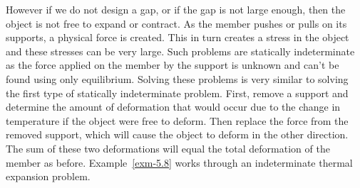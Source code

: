\documentclass[
  letterpaper,
  DIV=11,
  numbers=noendperiod]{scrreprt}
\theoremstyle{definition}
\theoremstyle{remark}
\begin{document}
However if we do not design a gap, or if the gap is not large enough,
then the object is not free to expand or contract. As the member pushes
or pulls on its supports, a physical force is created. This in turn
creates a stress in the object and these stresses can be very large.
Such problems are statically indeterminate as the force applied on the
member by the support is unknown and can't be found using only
equilibrium. Solving these problems is very similar to solving the first
type of statically indeterminate problem. First, remove a support and
determine the amount of deformation that would occur due to the change
in temperature if the object were free to deform. Then replace the force
from the removed support, which will cause the object to deform in the
other direction. The sum of these two deformations will equal the total
deformation of the member as before. Example~\ref{exm-5.8} works through
an indeterminate thermal expansion problem.
\end{document}
